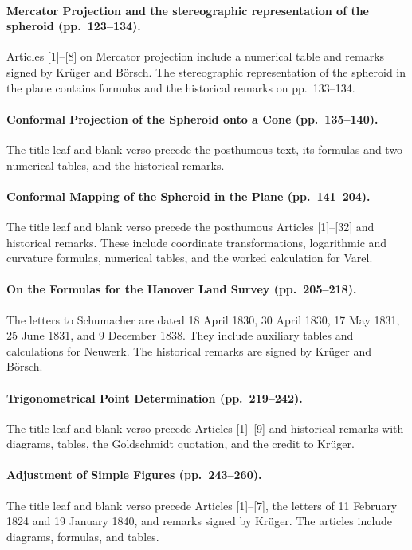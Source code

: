 \paragraph{Mercator Projection and the stereographic representation of the spheroid (pp.~123--134).}
Articles [1]--[8] on Mercator projection include a numerical table and remarks signed by Krüger and Börsch. The stereographic representation of the spheroid in the plane contains formulas and the historical remarks on pp.~133--134.

\paragraph{Conformal Projection of the Spheroid onto a Cone (pp.~135--140).}
The title leaf and blank verso precede the posthumous text, its formulas and two numerical tables, and the historical remarks.

\paragraph{Conformal Mapping of the Spheroid in the Plane (pp.~141--204).}
The title leaf and blank verso precede the posthumous Articles [1]--[32] and historical remarks. These include coordinate transformations, logarithmic and curvature formulas, numerical tables, and the worked calculation for Varel.

\paragraph{On the Formulas for the Hanover Land Survey (pp.~205--218).}
The letters to Schumacher are dated 18 April 1830, 30 April 1830, 17 May 1831, 25 June 1831, and 9 December 1838. They include auxiliary tables and calculations for Neuwerk. The historical remarks are signed by Krüger and Börsch.

\paragraph{Trigonometrical Point Determination (pp.~219--242).}
The title leaf and blank verso precede Articles [1]--[9] and historical remarks with diagrams, tables, the Goldschmidt quotation, and the credit to Krüger.

\paragraph{Adjustment of Simple Figures (pp.~243--260).}
The title leaf and blank verso precede Articles [1]--[7], the letters of 11 February 1824 and 19 January 1840, and remarks signed by Krüger. The articles include diagrams, formulas, and tables.

